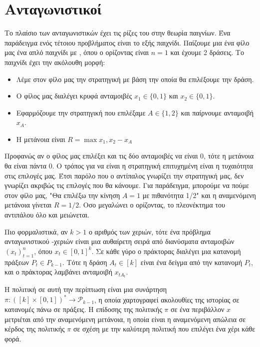 \section{Ανταγωνιστικοί }

Το πλαίσιο των ανταγωνιστικών  έχει τις ρίζες του στην θεωρία παιγνίων. Ένα παράδειγμα ενός τέτοιου προβλήματος είναι το εξής παιχνίδι. Παίζουμε μια ένα φίλο μας ένα απλό παιχνίδι με , όπου ο ορίζοντας είναι $n=1$ και έχουμε 2 δράσεις. Το παιχνίδι έχει την ακόλουθη μορφή:
\begin{itemize}
    \item Λέμε στον φίλο μας την στρατηγική με βάση την οποία θα επιλέξουμε την δράση.
    \item Ο φίλος μας διαλέγει κρυφά ανταμοιβές $x_1 \in \{0,1\}$ και $x_2 \in \{0,1\}$.
    \item Εφαρμόζουμε την στρατηγική που επιλέξαμε $A \in \{1,2\}$ και παίρνουμε ανταμοιβή $x_A$.
    \item Η μετάνοια είναι $R = \max{x_1,x_2} - x_A$
\end{itemize}

Προφανώς αν ο φίλος μας επιλέξει και τις δύο ανταμοιβές να είναι 0, τότε η μετάνοια θα είναι πάντα 0. Ο τρόπος για να είναι η στρατηγική επιτυχημένη είναι η τυχαιότητα στις επιλογές μας. Έτσι παρόλο που ο αντίπαλος γνωρίζει την στρατηγική μας, δεν γνωρίζει ακριβώς τις επιλογές που θα κάνουμε. Για παράδειγμα, μπορούμε να πούμε στον φίλο μας, "Θα επιλέξω την κίνηση $A=1$ με πιθανότητα 1/2" και η αναμενόμενη μετάνοια γίνεται $R=1/2$.  Οσο μεγαλώνει ο ορίζοντας, το πλεονέκτημα του αντιπάλου όλο και μειώνεται.

Πιο φορμαλιστικά, αν $k>1$ ο αριθμός των χεριών, τότε ένα πρόβλημα ανταγωνιστικού  -χεριών είναι μια αυθαίρετη σειρά από διανύσματα ανταμοιβών $(x_t)_{t=1}^n$, όπου $x_t \in [0,1]^k$. Σε κάθε γύρο ο πράκτορας διαλέγει μια κατανομή πράξεων $P_t \in P_{k-1}$. Τότε η δράση $A_t \in [k]$ είναι ένα δείγμα από την κατανομή $P_t$, και ο πράκτορας λαμβάνει ανταμοιβή $x_{tA_t}$.

Η πολιτική σε αυτή την περίπτωση είναι μια συνάρτηση $π: ([k] \times [0,1])^* \rightarrow \mathcal{P}_{k-1}$, η οποία χαρτογραφεί ακολουθίες της ιστορίας σε κατανομές πάνω σε πράξεις.
Η επίδοσης της πολιτικής $π$ σε ένα περιβάλλον $x$ μετριέται από την αναμενόμενη μετάνοια, η οποία είναι η αναμενόμενη απώλεια σε κέρδος της πολιτικής $π$ σε σχέση με την καλύτερη πολιτική που επιλέγει ένα χέρι κάθε φορά.

